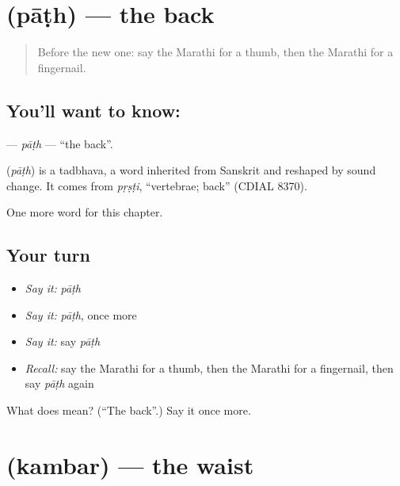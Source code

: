 \section[\texorpdfstring{\mr{पाठ} (pāṭh)}{पाठ (pāṭh)}]{ (pāṭh) — the back}

\label{lesson:MR-C146-path}



\begin{quote}
Before the new one: say the Marathi for a thumb, then the Marathi for a fingernail.
\end{quote}

\subsection*{You'll want to know: }
\textbf{} — \emph{pāṭh} — \textquotedblleft{}the back\textquotedblright{}.

\begin{cousinweb}
\textbf{} (\emph{pāṭh}) is a tadbhava, a word inherited from Sanskrit and reshaped by sound change. It comes from \emph{pṛṣṭi}, \textquotedblleft{}vertebrae; back\textquotedblright{} (CDIAL 8370).
\end{cousinweb}

\begin{grammarlens}[title={What you've built}]
One more word for this chapter.
\end{grammarlens}

\subsection*{Your turn}
\begin{itemize}
\raggedright
  \item \emph{Say it:} \emph{pāṭh}
  \item \emph{Say it:} \emph{pāṭh}, once more
  \item \emph{Say it:} say \emph{pāṭh}
  \item \emph{Recall:} say the Marathi for a thumb, then the Marathi for a fingernail, then say \emph{pāṭh} again
\end{itemize}

\begin{tcolorbox}[breakable,colback=teal!4,colframe=teal!35!black,title={Before you move on}]
What does  mean? (\textquotedblleft{}The back\textquotedblright{}.) Say it once more.
\end{tcolorbox}
\section[\texorpdfstring{\mr{कंबर} (kambar)}{कंबर (kambar)}]{ (kambar) — the waist}

